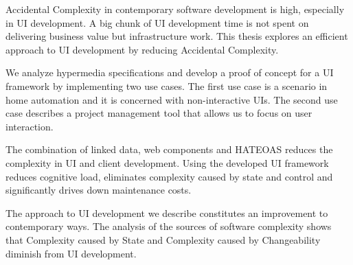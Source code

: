 Accidental Complexity in contemporary software development is high, especially in UI development. A big chunk of UI development time is not spent on delivering business value but infrastructure work. This thesis explores an efficient approach to UI development by reducing Accidental Complexity.

We analyze hypermedia specifications and develop a proof of concept for a UI framework by implementing two use cases. The first use case is a scenario in home automation and it is concerned with non-interactive UIs. The second use case describes a project management tool that allows us to focus on user interaction.

The combination of linked data, web components and HATEOAS reduces the complexity in UI and client development. Using the developed UI framework reduces cognitive load, eliminates complexity caused by state and control and significantly drives down maintenance costs.

The approach to UI development we describe constitutes an improvement to contemporary ways. The analysis of the sources of software complexity shows that Complexity caused by State and Complexity caused by Changeability diminish from UI development.
